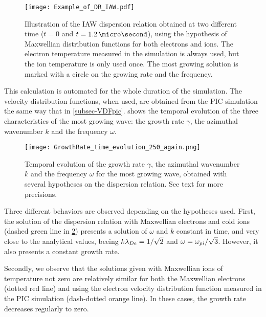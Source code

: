   \begin{figure}[hbt]
    \centering
    \texttt{[image: Example\_of\_DR\_IAW.pdf]}
    \caption{Illustration of the \ac{IAW} dispersion relation obtained at two different time ($t=0$ and $t=1.2\,\micro\second$), using the hypothesis of Maxwellian distribution functions for both electrons and ions. The electron temperature measured in the simulation is always used, but the ion temperature is only used once. The most growing solution is marked with a circle on the growing rate and the frequency.}
    \label{fig-Example_of_DR_IAW}
  \end{figure}
  
  
  This calculation is automated for the whole duration of the simulation.
  The velocity distribution functions, when used, are obtained from the \ac{PIC} simulation the same way that in \cref{subsec-VDFpic}.
   shows the temporal evolution of the three characteristics of the most growing wave: the growth rate $\gamma$, the azimuthal wavenumber $k$ and the frequency $\omega$.
  \begin{figure}[hbt]
    \centering
    \texttt{[image: GrowthRate\_time\_evolution\_250\_again.png]}  %
    \caption{Temporal evolution of the growth rate $\gamma$, the azimuthal wavenumber $k$ and the frequency $\omega$ for the most growing wave, obtained with several hypotheses on the dispersion relation. See text for more precisions. }
    \label{fig-time_wave}
  \end{figure}
  
  Three different behaviors are observed depending on the hypotheses used.
  First, the solution of the dispersion relation with Maxwellian electrons and cold ions (dashed green line in \cref{fig-time_wave}) presents a solution of $\omega$ and $k$ constant in time, and very close to the analytical values, beeing $k \lambda_{De} = 1/\sqrt{2}$ and $\omega = \omega_{pi}/\sqrt{3}$.
  However, it also presents a constant growth rate.
  
  Secondly, we observe that the solutions given with Maxwellian ions of temperature not zero are relatively similar for both the Maxwellian electrons  (dotted red line) and using the electron velocity distribution function measured in the \ac{PIC} simulation (dash-dotted orange line).
  In these cases, the growth rate decreases regularly to zero.
  
